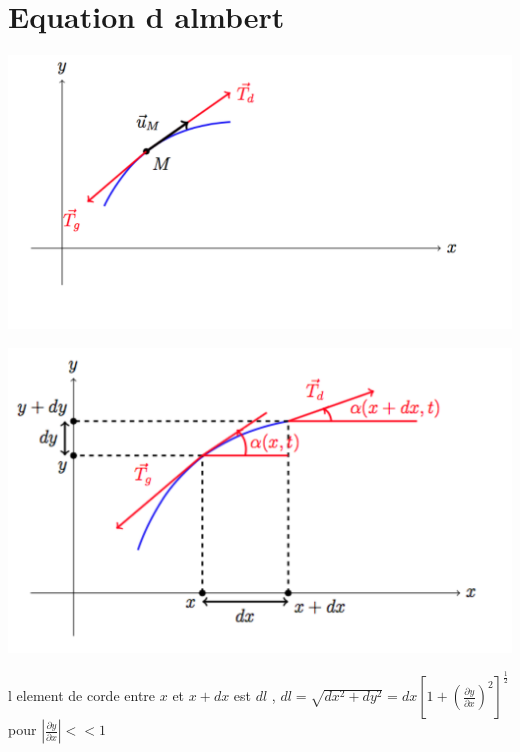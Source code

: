 \documentclass[12pt]{book}
\begin{document}
        \section{Equation d almbert}
            \begin{center}
                \begin{minipage}{0,49\linewidth}
                    \includegraphics[width=\linewidth]{pic/tension.png}
                \end{minipage}
                \begin{minipage}{0,49\linewidth}
                    \includegraphics[width=\linewidth]{pic/tension2.png}
                \end{minipage}
            \end{center}
            l element de corde entre $x$ et $x+dx$ est $dl$ , $dl=\sqrt{dx^2+dy^2}=dx[1+\left( \frac{\partial y}{\partial x } \right)^2 ]^{\frac{1}{2}}$ \\ 
             pour $|\frac{\partial y}{\partial x}|<<1$\\
\end{document}
